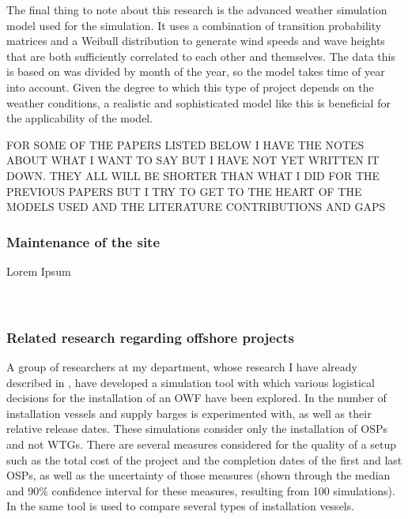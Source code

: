 \documentclass[a4paper,12pt]{article}
\begin{document}
The final thing to note about this research is the advanced weather simulation model used for the simulation. It uses a combination of transition probability matrices and a Weibull distribution to generate wind speeds and wave heights that are both sufficiently correlated to each other and themselves. The data this is based on was divided by month of the year, so the model takes time of year into account. Given the degree to which this type of project depends on the weather conditions, a realistic and sophisticated model like this is beneficial for the applicability of the model. 

FOR SOME OF THE PAPERS LISTED BELOW I HAVE THE NOTES ABOUT WHAT I WANT TO SAY BUT I HAVE NOT YET WRITTEN IT DOWN. THEY ALL WILL BE SHORTER THAN WHAT I DID FOR THE PREVIOUS PAPERS BUT I TRY TO GET TO THE HEART OF THE MODELS USED AND THE LITERATURE CONTRIBUTIONS AND GAPS

\subsubsection{Maintenance of the site} \label{sss:maint}
Lorem Ipsum \\ 
\cite{dinwoodie2012analysis} \\
\cite{merigaud2016condition} \\

\subsubsection{Related research regarding offshore projects} \label{sss:offsh}
A group of researchers at my department, whose research \cite{barlow2018mixed} I have already described in , have developed a simulation tool with which various logistical decisions for the installation of an OWF have been explored. In \cite{barlow2014support} the number of installation vessels and supply barges is experimented with, as well as their relative release dates. These simulations consider only the installation of OSPs and not WTGs. There are several measures considered for the quality of a setup such as the total cost of the project and the completion dates of the first and last OSPs, as well as the uncertainty of those measures (shown through the median and 90\% confidence interval for these measures, resulting from 100 simulations). In \cite{barlow2014assessment} the same tool is used to compare several types of installation vessels. 

\cite{barlow2017using} \\
\cite{leggate2010crew} \\
\cite{perez2013offshore}
\end{document}
